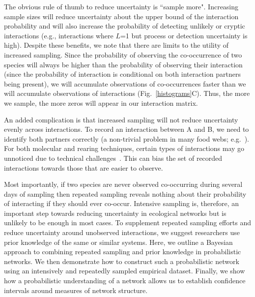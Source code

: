 \documentclass[12pt]{article}
\begin{document}
\begin{spacing}{2.0}


        The obvious rule of thumb to reduce uncertainty is ``sample more". Increasing sample sizes will reduce uncertainty about the upper bound of the interaction probability and will also increase the probability of detecting unlikely or cryptic interactions (e.g., interactions where $L$=1 but process or detection uncertainty is high). Despite these benefits, we note that there are limits to the utility of increased sampling. Since the probability of observing the co-occurrence of two species will always be higher than the probability of observing their interaction (since the probability of interaction is conditional on both interaction partners being present), we will accumulate observations of co-occurrences faster than we will accumulate observations of interactions (Fig.~\ref{histograms}C). Thus, the more we sample, the more zeros will appear in our interaction matrix.


        An added complication is that increased sampling will not reduce uncertainty evenly across interactions. To record an interaction between A and B, we need to identify both partners correctly (a non-trivial problem in many food webs; e.g.~\citealp{Kaartinen2011,Roslin2016}). For both molecular and rearing techniques, certain types of interactions may go unnoticed due to technical challenges~\citep{Wirta2014}. This can bias the set of recorded interactions towards those that are easier to observe.


        Most importantly, if two species are never observed co-occurring during several days of sampling then repeated sampling reveals nothing about their probability of interacting if they should ever co-occur. Intensive sampling is, therefore, an important step towards reducing uncertainty in ecological networks but is unlikely to be enough in most cases. To supplement repeated sampling efforts and reduce uncertainty around unobserved interactions, we suggest researchers use prior knowledge of the same or similar systems. Here, we outline a Bayesian approach to combining repeated sampling and prior knowledge in probabilistic networks. We then demonstrate how to construct such a probabilistic network using an intensively and repeatedly sampled empirical dataset. Finally, we show how a probabilistic understanding of a network allows us to establish confidence intervals around measures of network structure.



\end{spacing}
\end{document}
